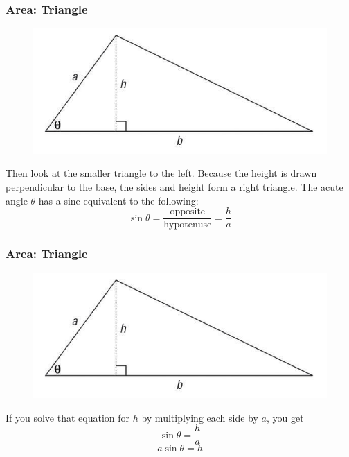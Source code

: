 \documentclass[xcolor=dvipsnames]{beamer}
\begin{document}
\begin{frame}
  \frametitle{Area: Triangle}
  \begin{figure}[h]
    \includegraphics[scale=.5]{./areatri.png}
  \end{figure}
  Then look at the smaller triangle to the left. Because the height is
  drawn perpendicular to the base, the sides and height form a right
  triangle. The acute angle $\theta$ has a sine equivalent to the
  following:
  \begin{equation}
    \label{eq:ayooshoh}
    \sin\theta=\frac{\mbox{opposite}}{\mbox{hypotenuse}}=\frac{h}{a}
  \end{equation}
\end{frame}

\begin{frame}
  \frametitle{Area: Triangle}
  \begin{figure}[h]
    \includegraphics[scale=.5]{./areatri.png}
  \end{figure}
If you solve that equation for $h$ by multiplying each side by $a$,
you get
\begin{equation}
  \label{eq:gohgaese}
  \sin\theta=\frac{h}{a}
\end{equation}
\begin{equation}
  \label{eq:sheichuc}
  a\sin\theta=h
\end{equation}
\end{frame}
\end{document}
